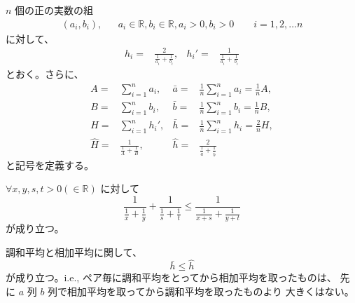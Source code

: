 \documentclass[12pt]{jsarticle}
\def\arithmean#1{\bar{#1}}
\def\arithsum#1{#1}
\def\harmmean#1{\hat{#1}}
\def\harmformula#1#2#3{\frac{#1}{\frac{1}{#2} + \frac{1}{#3}}}
\begin{document}
\begin{definition}[記号]
$n$ 個の正の実数の組
\begin{align}
(a_i, b_i), && a_i \in \mathbb{R}, b_i \in \mathbb{R},
a_i > 0, b_i >0 \qquad i = 1, 2, \ldots n
\end{align}
に対して、
\begin{align}
h_i = & \harmformula{2}{a_i}{b_i},
& {h_i}' = & \harmformula{1}{a_i}{b_i}
\end{align}
とおく。さらに、
\begin{align}
\arithsum{A} = & \sum_{i=1}^{n} a_i,
& \arithmean{a} = &
\frac{1}{n} \sum_{i=1}^{n} a_i
= \frac{1}{n} A, \\
\arithsum{B} = & \sum_{i=1}^{n} b_i,
& \arithmean{b} = &
\frac{1}{n} \sum_{i=1}^{n} b_i
= \frac{1}{n} B, \\
\arithsum{H} = & \sum_{i=1}^{n} {h_i}',
& \arithmean{h} = &
\frac{1}{n} \sum_{i=1}^{n} h_i
= \frac{2}{n} H, \\
\harmmean{H} = & \harmformula{1}{A}{B},
& \harmmean{h} = & \harmformula{2}{\arithmean{a}}{\arithmean{b}}
\end{align}
と記号を定義する。
\end{definition}

\begin{lemma}
$\forall x, y, s, t > 0 (\in \mathbb{R})$ に対して
\begin{equation}
\harmformula{1}{x}{y} + \harmformula{1}{s}{t}
\le \harmformula{1}{x + s}{y + t}
\end{equation}
が成り立つ。
\end{lemma}

\begin{theorem}
調和平均と相加平均に関して、
\begin{equation}
\arithmean{h} \le \harmmean{h}
\end{equation}
が成り立つ。i.e.,
ペア毎に調和平均をとってから相加平均を取ったものは、
先に $a$ 列 $b$ 列で相加平均を取ってから調和平均を取ったものより
大きくはない。
\end{theorem}
\end{document}
